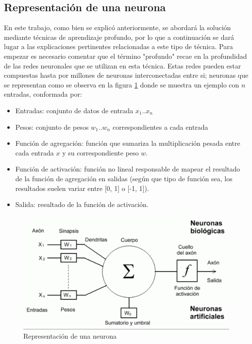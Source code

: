\subsection{Representación de una neurona}
 En este trabajo, como bien se explicó anteriormente, se abordará la solución mediante técnicas de aprendizaje profundo, por lo que a continuación se dará lugar a las explicaciones pertinentes relacionadas a este tipo de técnica.
 Para empezar es necesario comentar que el término "profundo" recae en la profundidad de las redes neuronales que se utilizan en esta técnica. Estas redes pueden estar compuestas hasta por millones de neuronas interconectadas entre si; neuronas que se representan como se observa en la figura \ref{fig:representacion_neurona} donde se muestra un ejemplo con \(n\) entradas, conformada por: 
 \begin{itemize}
 	\item Entradas: conjunto de datos de entrada \(x_1\)..\(x_n\)
 	\item Pesos: conjunto de pesos \(w_1\)..\(w_n\) correspondientes a cada entrada
 	\item Función de agregación: función que sumariza la multiplicación pesada entre cada entrada \(x\) y su correspondiente peso \(w\).
	\item Función de activación: función no lineal responsable de mapear el resultado de la función de agregación en salidas (según que tipo de función sea, los resultados suelen variar entre [0, 1] o [-1, 1]).
	\item Salida: resultado de la función de activación.
 \end{itemize}
 
 
\begin{figure}[!h]
\centering
\includegraphics[width=.8\linewidth]{images/representacion_neurona}
\caption[Representación de una neurona]{Representación de una neurona}
\label{fig:representacion_neurona}
\end{figure}

